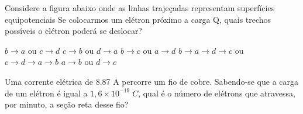 \documentclass[12pt, addpoints]{exam}
\begin{document}
    \begin{questions}
\begin{multicols*}{2}
\question Considere a figura abaixo onde as linhas trajeçadas representam superfícies equipotenciais Se colocarmos um elétron próximo a carga Q, quais trechos possíveis o elétron poderá se deslocar?
        
        \begin{center}
            \begin{minipage}[c]{0.5\linewidth}
            \end{minipage}
        \end{center}
        
        

\begin{choices}
\choice $b\rightarrow a$ ou $c\rightarrow d$ 
\choice $c\rightarrow b$ ou $d\rightarrow a$ 
\choice $b\rightarrow c$ ou $a\rightarrow d$ 
\choice $b\rightarrow a\rightarrow d\rightarrow c$ ou $c\rightarrow d\rightarrow a\rightarrow b$ 
\choice $a\rightarrow b$ ou $d\rightarrow c$ 
\end{choices}
\question Uma corrente elétrica de    8.87 A percorre um ﬁo de cobre. Sabendo-se que a carga de um elétron é igual a $1,6\times 10^{-19}\;C$, qual é o número de elétrons que atravessa, por minuto, a seção reta desse ﬁo?


\end{multicols*}
\end{questions}
\end{document}
